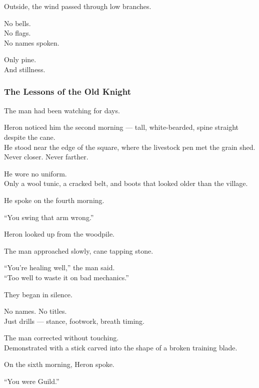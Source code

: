 \documentclass[12pt]{article}
\begin{document}
\vspace{1em}

Outside, the wind passed through low branches.

No bells.\\
No flags.\\
No names spoken.

Only pine.\\
And stillness.

\dotfill

\subsubsection{The Lessons of the Old Knight}

The man had been watching for days.

Heron noticed him the second morning — tall, white-bearded, spine straight despite the cane.\\
He stood near the edge of the square, where the livestock pen met the grain shed.\\
Never closer. Never farther.

He wore no uniform.\\
Only a wool tunic, a cracked belt, and boots that looked older than the village.

He spoke on the fourth morning.

\vspace{1em}

“You swing that arm wrong.”

Heron looked up from the woodpile.

The man approached slowly, cane tapping stone.

“You're healing well,” the man said.\\
“Too well to waste it on bad mechanics.”

\vspace{1em}

They began in silence.

No names. No titles.\\
Just drills — stance, footwork, breath timing.

The man corrected without touching.\\
Demonstrated with a stick carved into the shape of a broken training blade.

\vspace{1em}

On the sixth morning, Heron spoke.

“You were Guild.”
\end{document}
